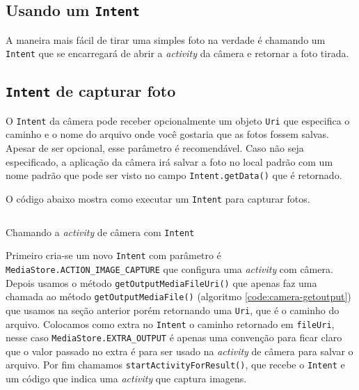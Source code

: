 \documentclass[a4paper,12pt,brazil]{book}
\begin{document}
\begin{singlespace}

	\section{Usando um \texttt{Intent}}

		A maneira mais fácil de tirar uma simples foto na verdade é chamando um \texttt{Intent} que se encarregará de abrir a \emph{activity} da câmera e retornar a foto tirada.

	\subsection{\texttt{Intent} de capturar foto}
		
		O \texttt{Intent} da câmera pode receber opcionalmente um objeto \texttt{Uri} que especifica o caminho e o nome do arquivo onde você gostaria que as fotos fossem salvas. Apesar de ser opcional, esse parâmetro é recomendável. Caso não seja especificado, a aplicação da câmera irá salvar a foto no local padrão com um nome padrão que pode ser visto no campo \texttt{Intent.getData()} que é retornado.

		O código abaixo mostra como executar um \texttt{Intent} para capturar fotos.

		\begin{listing}[H]
		\inputminted[linenos=true,fontsize=\small,frame=lines, framesep=2mm, tabsize=2,numbersep=5pt]{java}{src/api/camera/captureintent.java}
		\caption{Chamando a \emph{activity} de câmera com \texttt{Intent}}
		\label{code:cameraintent}
		\end{listing} 		

		Primeiro cria-se um novo \texttt{Intent} com parâmetro é \texttt{MediaStore.ACTION\_IMAGE\_CAPTURE} que configura uma \emph{activity} com câmera. Depois usamos o método \texttt{getOutputMediaFileUri()} que apenas faz uma chamada ao método \texttt{getOutputMediaFile()} (algoritmo \ref{code:camera-getoutput}) que usamos na seção anterior porém retornando uma \texttt{Uri}, que é o caminho do arquivo. Colocamos como extra no \texttt{Intent} o caminho retornado em \texttt{fileUri}, nesse caso \texttt{MediaStore.EXTRA\_OUTPUT} é apenas uma convenção para ficar claro que o valor passado no extra é para ser usado na \emph{activity} de câmera para salvar o arquivo. Por fim chamamos \texttt{startActivityForResult()}, que recebe o \texttt{Intent} e um código que indica uma \emph{activity} que captura imagens.


\end{singlespace}
\end{document}
